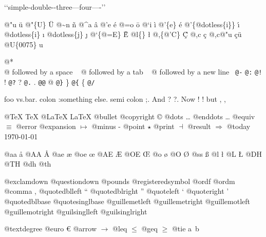 \documentclass{book}
\begin{document}
\begin{titlepage}
`\hbox{}`simple-double-\hbox{}-three---four----'\hbox{}'\leavevmode{}\\

%
%
%
%

@"u \"{u} 
@"\{U\} \"{U} 
@\~{}n \~{n}
@\^{}a \^{a}
@'e \'{e}
@=o \={o}
@`i \`{i}
@'\{e\} \'{e}
@'\{@dotless\{i\}\} \'{\i{}} 
@dotless\{i\} \i{}
@dotless\{j\} \j{}
@`\{@=E\} \`{\={E}} 
@l\{\} \l{}
@,\{@'C\} \c{\'{C}}
@,c \c{c}
@,c@"u \c{c}\"{u} \leavevmode{}\\

@U\{0075\} u

@* \leavevmode{}\\
@ followed by a space
\ {}
@ followed by a tab
\ {}
@ followed by a new line
\ {}\texttt{@-} \-{}
\texttt{@:} \@
\texttt{@!} \@!
\texttt{@?} \@?
\texttt{@.} \@.
\texttt{@@} @
\texttt{@\}} \}
\texttt{@\{} \{
\texttt{@/} 

foo vs.\@ bar. 
colon :\@And something else.
semi colon ;\@.
And ? ?\@.
Now ! !\@@
but , ,\@

@TeX \TeX{}
@LaTeX \LaTeX{}
@bullet \textbullet{}
@copyright \copyright{}
@dots \dots{}\@
@enddots \dots{}
@equiv $\equiv{}$
@error 
@expansion $\mapsto{}$
@minus -
@point $\star{}$
@print $\dashv{}$
@result $\Rightarrow{}$
@today \today{}

@aa \aa{}
@AA \AA{}
@ae \ae{}
@oe \oe{}
@AE \AE{}
@OE \OE{}
@o \o{}
@O \O{}
@ss \ss{}
@l \l{}
@L \L{}
@DH \DH{}
@TH \TH{}
@dh \dh{}
@th \th{}

@exclamdown \textexclamdown{}
@questiondown \textquestiondown{}
@pounds \textsterling{}
@registeredsymbol \circledR{}
@ordf \textordfeminine{}
@ordm \textordmasculine{}
@comma ,
@quotedblleft \textquotedblleft{}
@quotedblright \textquotedblright{}
@quoteleft \textquoteleft{}
@quoteright \textquoteright{}
@quotedblbase \quotedblbase{}
@quotesinglbase \quotesinglbase{}
@guillemetleft \guillemotleft{}
@guillemetright \guillemotright{}
@guillemotleft \guillemotleft{}
@guillemotright \guillemotright{}
@guilsinglleft \guilsinglleft{}
@guilsinglright \guilsinglright{}

@textdegree \textdegree{}
@euro \euro{}
@arrow $\rightarrow{}$
@leq $\leq{}$
@geq $\geq{}$
@tie a~b


\end{titlepage}
\end{document}
